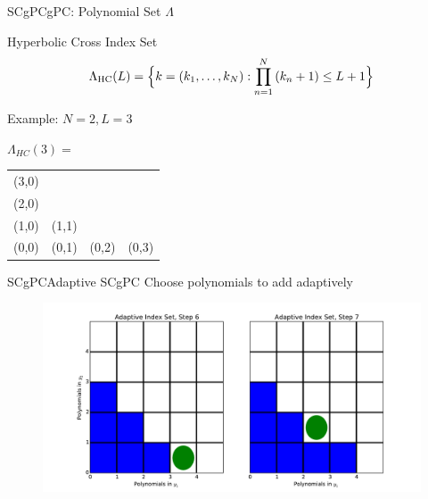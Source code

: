 \documentclass{beamer}
\begin{document}
\begin{frame}{SCgPC}{gPC: Polynomial Set $\Lambda$}%
  \vfill
  \centering
  \begin{exampleblock}{Hyperbolic Cross Index Set}
    \[\Lambda_\text{HC}(L)=\Big\{k=(k_1,\ldots,k_N):\prod_{n=1}^N\qty(k_n+1) \leq L+1 \Big\}\]
  \end{exampleblock}
  \vfill
  Example: $N=2,L=3$
  \vfill
    \begin{table}\centering
      $\Lambda_{HC}(3)=$
      \begin{tabular}{|c c c c|} \hline
        (3,0) &       &       &       \\
        (2,0) &       &       &       \\
        (1,0) & (1,1) &       &       \\
        (0,0) & (0,1) & (0,2) & (0,3) \\ \hline
      \end{tabular}
    \end{table}
  \vfill
\end{frame}

\begin{frame}{SCgPC}{Adaptive SCgPC}%
  Choose polynomials to add adaptively
    \begin{figure}[h!]
      \centering
      \includegraphics[width=\linewidth]{asc_step}
    \end{figure}
\end{frame}
\end{document}
